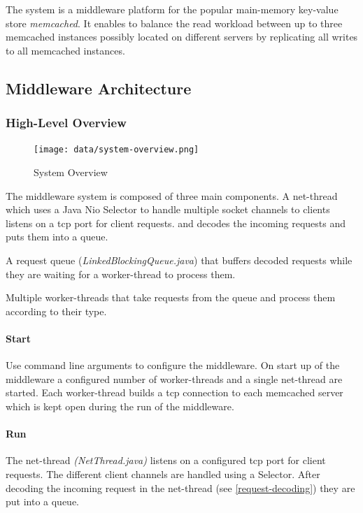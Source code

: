 \documentclass[11pt,a4paper]{article}
\begin{document}
The system is a middleware platform for the popular main-memory key-value store \emph{memcached}. 
It enables to balance the read workload between up to three memcached instances possibly located on different servers by replicating all writes to all memcached instances.


\subsection{Middleware Architecture}
\subsubsection{High-Level Overview}

\begin{figure}
	\centering
	\texttt{[image: data/system-overview.png]}
	\caption{System Overview}
\end{figure}
The middleware system is composed of three main components. 
A net-thread which uses a Java Nio Selector to handle multiple socket channels to clients listens on a tcp port for client requests. and decodes the incoming requests and puts them into a queue.

A request queue (\emph{LinkedBlockingQueue.java}) that buffers decoded requests while they are waiting for a worker-thread to process them.

Multiple worker-threads that take requests from the queue and process them according to their type.

\paragraph{Start}
Use command line  arguments to configure the middleware.
On start up of the middleware a configured number of worker-threads and a single net-thread are started.
Each worker-thread builds a tcp connection to each memcached server which is kept open during the run of the middleware.

\paragraph{Run}
The net-thread \emph{(NetThread.java)} listens on a configured tcp port for client requests. The different client channels are handled using a Selector.
After decoding the incoming request in the net-thread (see \ref{request-decoding}) they are put into a queue.
\end{document}
